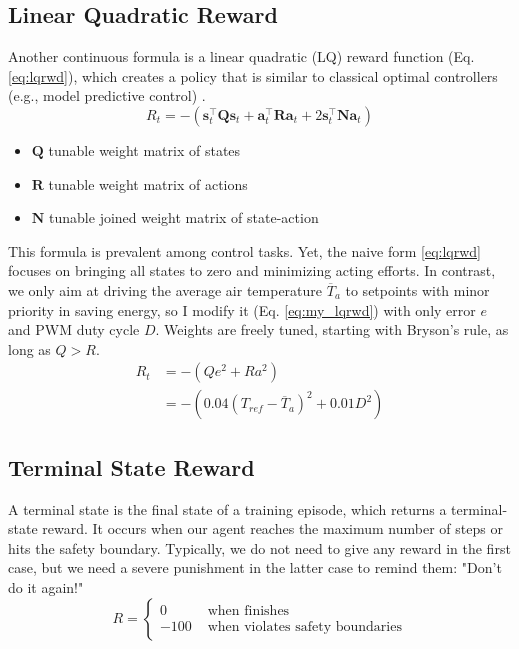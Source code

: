 \documentclass[../main.tex]{subfiles}
\begin{document}
\subsection{Linear Quadratic Reward}
Another continuous formula is a linear quadratic (LQ) reward function (Eq. \ref{eq:lqrwd}), which creates a policy that is similar to classical optimal controllers (e.g., model predictive control) \cite{zhou2022single, matlab_obsrwd}.
\begin{equation}
    R_t = - \left( \mathbf{s}_t^\top \mathbf{Q} \mathbf{s}_t + \mathbf{a}_t^\top \mathbf{R} \mathbf{a}_t + 2\mathbf{s}_t^\top \mathbf{N} \mathbf{a}_t \right)
\label{eq:lqrwd}
\end{equation}
\begin{itemize}
    \item $\mathbf{Q}$ tunable weight matrix of states
    \item $\mathbf{R}$ tunable weight matrix of actions
    \item $\mathbf{N}$ tunable joined weight matrix of state-action
\end{itemize}
This formula is prevalent among control tasks. Yet, the naive form \ref{eq:lqrwd} focuses on bringing all states to zero and minimizing acting efforts. In contrast, we only aim at driving the average air temperature $\overline{T}_a$ to setpoints with minor priority in saving energy, so I modify it (Eq. \ref{eq:my_lqrwd}) with only error $e$ and PWM duty cycle $D$. Weights are freely tuned, starting with Bryson's rule, as long as $Q > R$.
\begin{equation}
    \begin{split}
        R_t &= - \left( Qe^2 + Ra^2 \right) \\
          &= - \left( 0.04(T_{ref} - \overline{T}_a)^2 + 0.01D^2 \right)
    \end{split}
\label{eq:my_lqrwd}
\end{equation}

\subsection{Terminal State Reward}
A terminal state is the final state of a training episode, which returns a terminal-state reward. It occurs when our agent reaches the maximum number of steps or hits the safety boundary. Typically, we do not need to give any reward in the first case, but we need a severe punishment in the latter case to remind them: "Don't do it again!"
\begin{equation} \label{eq:termrwd}
    R = \left\{ \begin{aligned}
        0 & \text{ when finishes} \\
        -100 & \text{ when violates safety boundaries}
    \end{aligned} \right.
\end{equation}
\end{document}

